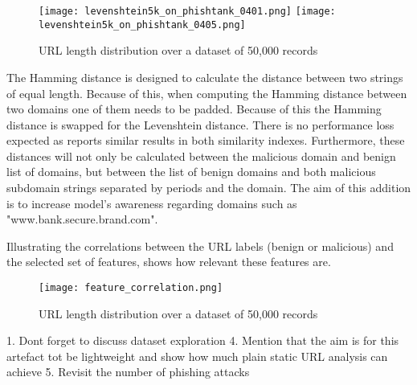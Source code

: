 	\begin{figure}[t]
		\centering
		\texttt{[image: levenshtein5k\_on\_phishtank\_0401.png]}	\texttt{[image: levenshtein5k\_on\_phishtank\_0405.png]}
		\caption{URL length distribution over a dataset of 50,000 records}
		\label{fig:HAMMING_ON_MIXED}
	\end{figure}

	The Hamming distance is designed to calculate the distance between two strings of equal length. Because of this, when computing the Hamming distance between two domains one of them needs to be padded. Because of this the Hamming distance is swapped for the Levenshtein distance. There is no performance loss expected as \cite{SVM_SIMILARITY_INDEX} reports similar results in both similarity indexes. Furthermore, these distances will not only be calculated between the malicious domain and benign list of domains, but between the list of benign domains and both malicious subdomain strings separated by periods and the domain. The aim of this addition is to increase model's awareness regarding domains such as "www.bank.secure.brand.com".

	Illustrating the correlations between the URL labels (benign or malicious) and the selected set of features, shows how relevant these features are.

	\begin{figure}[b]
		\centering
		\texttt{[image: feature\_correlation.png]}
		\caption{URL length distribution over a dataset of 50,000 records}
		\label{fig:FEATURE_CORRELATION}
	\end{figure}





	1. Dont forget to discuss dataset exploration
	4. Mention that the aim is for this artefact tot be lightweight and show how much plain static URL analysis can achieve
	5. Revisit the number of phishing attacks

\fi